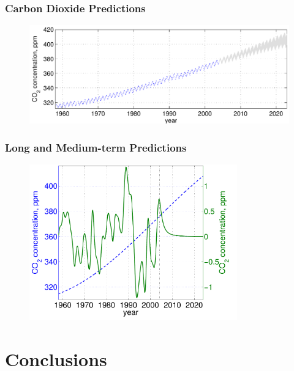 \documentclass[10pt]{beamer}
\begin{document}
  \begin{frame}
    \frametitle{Carbon Dioxide Predictions}

    \begin{figure}
      \centering
      \includegraphics[width=\textwidth]{prediction2.png}
    \end{figure}
  \end{frame}

  \begin{frame}
    \frametitle{Long and Medium-term Predictions}

    \begin{figure}
      \centering
      \includegraphics[width=0.8\textwidth]{prediction3.png}
    \end{figure}
  \end{frame}

  \section{Conclusions}
\end{document}
